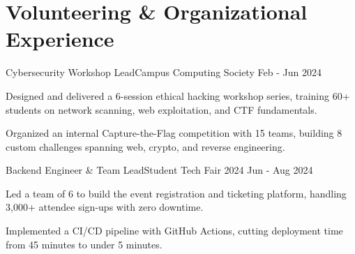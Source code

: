 \section{\textbf{Volunteering \& Organizational Experience}}
    \resumeSubHeadingListStart

    \resumeEntry
        {Cybersecurity Workshop Lead}{Campus Computing Society}
        {}{Feb - Jun 2024}
        \vspace{-2.0mm}
        \resumeItemListStart
            \item {Designed and delivered a 6-session ethical hacking workshop series, training 60+ students on network scanning, web exploitation, and CTF fundamentals.}
            \item {Organized an internal Capture-the-Flag competition with 15 teams, building 8 custom challenges spanning web, crypto, and reverse engineering.}
        \resumeItemListEnd
    \vspace{-3.0mm}

    \resumeEntry
        {Backend Engineer \& Team Lead}{Student Tech Fair 2024}
        {}{Jun - Aug 2024}
        \vspace{-2.0mm}
        \resumeItemListStart
            \item {Led a team of 6 to build the event registration and ticketing platform, handling 3,000+ attendee sign-ups with zero downtime.}
            \item {Implemented a CI/CD pipeline with GitHub Actions, cutting deployment time from 45 minutes to under 5 minutes.}
        \resumeItemListEnd
    \vspace{-3.0mm}

    \resumeSubHeadingListEnd
\vspace{-5.5mm}
